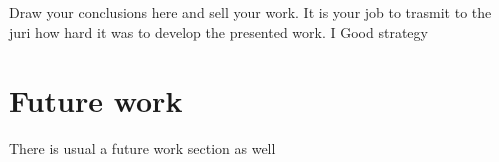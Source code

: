 Draw your conclusions here and sell your work. It is your job to trasmit to the juri how hard it was to develop the presented work. I Good strategy 


\section{Future work}
There is usual a future work section as well

\cleardoublepage
 
